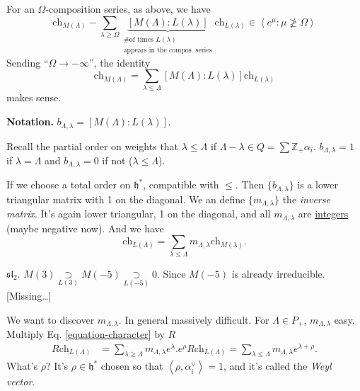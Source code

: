 For an $\Omega$-composition series, as above, we have
$$
\text{ch}_{M(\Lambda)}-\sum_{\lambda \geq \Omega}
\underbrace{[M(\Lambda):L(\lambda)]}
_{\substack{\text{\# of times $L(\lambda)$} \\ \text{
appears in the compos. series}}}
\text{ch}_{L(\lambda)}
\in \left<e^{\mu}:\mu \not \geq \Omega\right>
$$
Sending  ``$\Omega \to -\infty$'', the identity
$$
\text{ch}_{M(\Lambda)}=\sum_{\lambda \leq  \Lambda}
[M(\Lambda):L(\lambda)]\text{ch}_{L(\lambda)}
$$
makes sense.

{\bf Notation.} $b_{\Lambda,\lambda}=[M(\Lambda):L(\lambda)]$.

\begin{remark}
\label{remark-total-order-on-hstar}
Recall the partial order on weights that $\lambda \leq \Lambda$ if 
$\Lambda-\lambda \in Q= \sum \mathbb{Z}_+\alpha_i$.
$b_{\Lambda,\lambda}=1$ if $\lambda = \Lambda$ and 
$b_{\Lambda,\lambda}=0$ if not ($\lambda \leq  \Lambda$).

If we choose a total order on $\mathfrak{h}^*$, compatible with $\leq$.
Then $\{b_{\Lambda,\lambda}\}$ is a lower triangular matrix with 1 
on the diagonal.
We an define $\{m_{\Lambda,\lambda}\}$ the {\it inverse matrix}.
It's again lower triangular, 1 on the diagonal, and all
$m_{\Lambda,\lambda}$ are \underline{integers} (maybe negative now). 
And we have
\begin{equation}
\label{equation-character}
\text{ch}_{L(\Lambda)}=\sum_{\lambda \leq  \Lambda}m_{\Lambda,\lambda}
\text{ch}_{M(\lambda)}.
\end{equation}
\end{remark}

\begin{example}
\label{example-sl2-characters}
$\mathfrak{sl}_2$. $M(3)\underset{L(3)}{\supset}M(-5)
\underset{L(-5)}{\supset}0$. Since $M(-5)$ is already irreducible.
[Missing…]
\end{example}

We want to discover $m_{\Lambda,\lambda}$. 
In general massively difficult.
For $\Lambda \in P_+$, $m_{\Lambda,\lambda}$ easy.
Multiply Eq. \ref{equation-character} by  $R$
\begin{align*}
R\text{ch}_{L(\Lambda)}&=\sum_{\lambda \geq  \Lambda} m_{\Lambda,\lambda}
e^{\lambda}.
e^{\rho}R\text{ch}_{L(\Lambda)}=\sum_{\lambda \leq  \Lambda}
m_{\Lambda,\lambda}e^{\lambda+\rho}.
\end{align*}
What's $\rho$? It's $\rho \in \mathfrak{h}^*$ chosen so that
$\left<\rho,\alpha_i^\vee\right>=1$, and it's called 
the {\it Weyl vector}.

